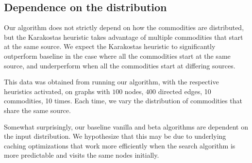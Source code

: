 \subsection{Dependence on the distribution}

Our algorithm does not strictly depend on how the commodities are distributed, but the Karakostas heuristic takes
advantage of multiple commodities that start at the same source. We expect the Karakostas heuristic to significantly
outperform baseline in the case where all the commodities start at the same source, and underperform when all the
commodities start at differing sources.

This data was obtained from running our algorithm, with the respective heuristics activated, on graphs with $100$
nodes, $400$ directed edges, 10 commodities, 10
times. Each time, we vary the distribution of commodities that share the same source.

Somewhat surprisingly, our baseline vanilla and beta algorithms are dependent on the input distribution.  We hypothesize
that this may be due to underlying caching optimizations that work more efficiently when the search algorithm is more
predictable and visits the same nodes initially.


